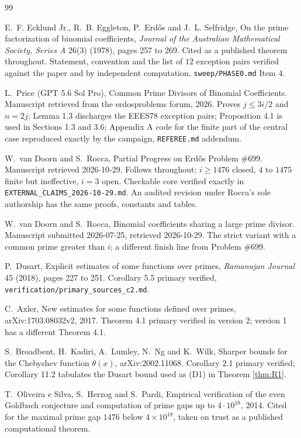 \documentclass[11pt]{article}
\theoremstyle{remark}
\begin{document}
\begin{thebibliography}{99}

E.~F. Ecklund Jr., R.~B. Eggleton, P.~Erd\H{o}s and J.~L. Selfridge,
On the prime factorization of binomial coefficients,
\emph{Journal of the Australian Mathematical Society, Series A} 26(3) (1978), pages 257 to 269.
Cited as a published theorem throughout. Statement, convention and the list of $12$ exception pairs verified against the paper and by independent computation, \texttt{sweep/PHASE0.md} Item 4.

L.~Price (GPT 5.6 Sol Pro),
Common Prime Divisors of Binomial Coefficients.
Manuscript retrieved from the erdosproblems forum, 2026.
Proves $j\le 3i/2$ and $n=2j$; Lemma 1.3 discharges the EEES78 exception pairs; Proposition 4.1 is used in Sections 1.3 and 3.6; Appendix A code for the finite part of the central case reproduced exactly by the campaign, \texttt{REFEREE.md} addendum.

W.~van Doorn and S.~Rocca,
Partial Progress on Erd\H{o}s Problem \#699.
Manuscript retrieved 2026-10-29. Follows \cite{Price} throughout; $i\ge 1476$ closed, $4$ to $1475$ finite but ineffective, $i=3$ open. Checkable core verified exactly in \texttt{EXTERNAL\_CLAIMS\_2026-10-29.md}. An audited revision under Rocca's sole authorship has the same proofs, constants and tables.

W.~van Doorn and S.~Rocca,
Binomial coefficients sharing a large prime divisor.
Manuscript submitted 2026-07-25, retrieved 2026-10-29. The strict variant with a common prime greater than $i$; a different finish line from Problem \#699.

P.~Dusart,
Explicit estimates of some functions over primes,
\emph{Ramanujan Journal} 45 (2018), pages 227 to 251.
Corollary 5.5 primary verified, \texttt{verification/primary\_sources\_c2.md}.

C.~Axler,
New estimates for some functions defined over primes,
arXiv:1703.08032v2, 2017.
Theorem 4.1 primary verified in version 2; version 1 has a different Theorem 4.1.

S.~Broadbent, H.~Kadiri, A.~Lumley, N.~Ng and K.~Wilk,
Sharper bounds for the Chebyshev function $\theta(x)$,
arXiv:2002.11068.
Corollary 2.1 primary verified; Corollary 11.2 tabulates the Dusart bound used as (D1) in Theorem \ref{thm:R1}.

T.~Oliveira e Silva, S.~Herzog and S.~Pardi,
Empirical verification of the even Goldbach conjecture and computation of prime gaps up to $4\cdot 10^{18}$, 2014.
Cited for the maximal prime gap $1476$ below $4\times 10^{18}$, taken on trust as a published computational theorem.


\end{thebibliography}
\end{document}
